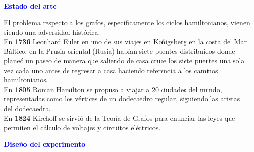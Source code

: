 \documentclass[11pt,a4paper]{article}
\begin{document}
\begin{center}
\LARGE \textbf{\textcolor{blue}{Estado del arte}}\\[1cm]
\end{center}
\Large
\begin{enumerate}
\begin{multicols}{2}
El problema respecto a los grafos, espec{\'i}ficamente los ciclos hamiltonianos, vienen siendo una adversidad hist{\'o}rica.\\
En \textbf{1736} Leonhard Euler en uno de sus viajes en Koñigsberg en la costa del Mar B{\'a}ltico, en la Prusia oriental (Rusia) hab{\'i}an siete puentes distribuidos donde plane{\'o} un paseo de manera que saliendo de casa cruce los siete puentes una sola vez cada uno antes de regresar a casa haciendo referencia a los caminos hamiltonianos.\\
En \textbf{1805} Roman Hamilton se propuso a viajar a 20 ciudades del mundo, representadas como los v{\'e}rtices de un dodecaedro regular, siguiendo las aristas del dodecaedro.\\
En \textbf{1824} Kirchoff se sirvi{\'o} de la Teor{\'i}a de Grafos para enunciar las leyes que permiten el c{\'a}lculo de voltajes y circuitos el{\'e}ctricos.
\end{multicols}
\end{enumerate}

\begin{center}
\textbf{\textcolor{blue}{Diseño del experimento}}\\
\end{center}
\end{document}
